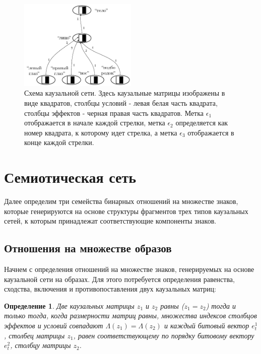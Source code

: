 \documentclass[12pt]{scrartcl}
\newtheorem{definition}{Определение}
\begin{document}
	\begin{figure}[H]
		\centering
		\includegraphics[width=0.5\textwidth]{automata/caus_net}
		\caption{Схема каузальной сети. Здесь каузальные матрицы изображены в виде квадратов, столбцы условий - левая белая часть квадрата, столбцы эффектов - черная правая часть квадратов. Метка $\epsilon_1$ отображается в начале каждой стрелки, метка $\epsilon_2$ определяется как номер квадрата, к которому идет стрелка, а метка $\epsilon_3$ отображается в конце каждой стрелки.}
		\label{fig:caus_net}		
	\end{figure}
	
	\section{Семиотическая сеть}
	
	Далее определим три семейства бинарных отношений на множестве знаков, которые  генерируются на основе структуры фрагментов трех типов каузальных сетей, к которым принадлежат соответствующие компоненты знаков.
		
	\subsection{Отношения на множестве образов}	
	
	Начнем с определения отношений на множестве знаков, генерируемых на основе каузальной сети на образах. Для этого потребуется определения равенства, сходства, включения и противопоставления двух каузальных матриц:
	
	\begin{definition}
		Две каузальных матрицы $z_1$ и $z_2$ равны ($z_1=z_2$) тогда и только тогда, когда размерности матриц равны, множества индексов столбцов эффектов и условий совпадают $\Lambda({z_1})=\Lambda({z_2})$ и каждый битовый вектор $e_t^1$, столбец матрицы $z_1$, равен соответствующему по порядку битовому вектору $e_t^2$, столбцу матрицы $z_2$.
	\end{definition}
	
\end{document}
